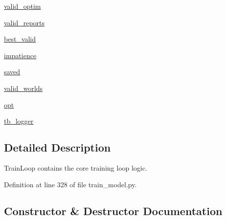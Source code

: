 \begin{DoxyCompactItemize}
\hyperlink{classparlai_1_1scripts_1_1train__model_1_1TrainLoop_abe8e421aafd3a42103c794f3e3a1bcc6}{valid\+\_\+optim}
\item 
\hyperlink{classparlai_1_1scripts_1_1train__model_1_1TrainLoop_abceaa403716b5def408e2fedca6c651d}{valid\+\_\+reports}
\item 
\hyperlink{classparlai_1_1scripts_1_1train__model_1_1TrainLoop_a48a44b00d7b814ff20d0599803e92411}{best\+\_\+valid}
\item 
\hyperlink{classparlai_1_1scripts_1_1train__model_1_1TrainLoop_aeb16930507dc585a10096e2b235e2745}{impatience}
\item 
\hyperlink{classparlai_1_1scripts_1_1train__model_1_1TrainLoop_a22cd642f6665fabdc49cdd294e257643}{saved}
\item 
\hyperlink{classparlai_1_1scripts_1_1train__model_1_1TrainLoop_a45643d393057a2a47e8a6e74acdc7515}{valid\+\_\+worlds}
\item 
\hyperlink{classparlai_1_1scripts_1_1train__model_1_1TrainLoop_a3f9cd4c0c08f457b3ecfd1e494ccf58c}{opt}
\item 
\hyperlink{classparlai_1_1scripts_1_1train__model_1_1TrainLoop_af6636a1279a3fb33f57ba1af500d049b}{tb\+\_\+logger}
\end{DoxyCompactItemize}


\subsection{Detailed Description}
\begin{DoxyVerb}TrainLoop contains the core training loop logic.
\end{DoxyVerb}
 

Definition at line 328 of file train\+\_\+model.\+py.



\subsection{Constructor \& Destructor Documentation}
\mbox{\label{classparlai_1_1scripts_1_1train__model_1_1TrainLoop_a87a9194a461efe30e8b4de6cd4036699}} 
